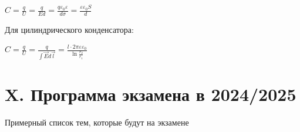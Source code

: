 \documentclass[12pt]{article}
\begin{document}
$C = \frac{q}{U} = \frac{q}{Ed} = \frac{q \varepsilon_0 \varepsilon}{d\sigma} = \frac{\varepsilon \varepsilon_0 S}{d}$

Для цилиндрического конденсатора:

$C = \frac{q}{U} = \frac{q}{\int \vec{E}d\vec{l}} = \frac{l \cdot 2\pi \varepsilon \varepsilon_0}{\ln \frac{r_2}{r_1}}$





    \clearpage

    \section{X. Программа экзамена в 2024/2025}

    Примерный список тем, которые будут на экзамене
\end{document}

